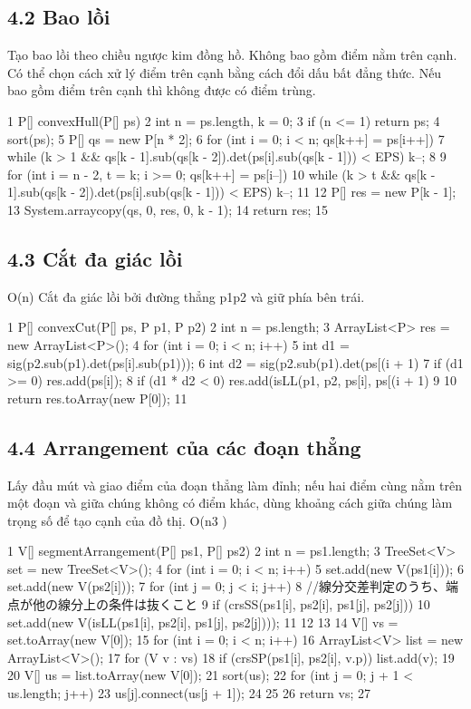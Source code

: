 \documentclass[11pt]{article}
\begin{document}
\subsection{4.2 Bao lồi}
\begin{NoteBlock}
Tạo bao lồi theo chiều ngược kim đồng hồ.
Không bao gồm điểm nằm trên cạnh.
Có thể chọn cách xử lý điểm trên cạnh bằng cách đổi dấu bất đẳng thức.
Nếu bao gồm điểm trên cạnh thì không được có điểm trùng.
\end{NoteBlock}
\begin{Code}
1 P[] convexHull(P[] ps) {
2 int n = ps.length, k = 0;
3 if (n <= 1) return ps;
4 sort(ps);
5 P[] qs = new P[n * 2];
6 for (int i = 0; i < n; qs[k++] = ps[i++]) {
7 while (k > 1 && qs[k - 1].sub(qs[k - 2]).det(ps[i].sub(qs[k - 1])) < EPS) k--;
8 }
9 for (int i = n - 2, t = k; i >= 0; qs[k++] = ps[i--]) {
10 while (k > t && qs[k - 1].sub(qs[k - 2]).det(ps[i].sub(qs[k - 1])) < EPS) k--;
11 }
12 P[] res = new P[k - 1];
13 System.arraycopy(qs, 0, res, 0, k - 1);
14 return res;
15 }
\end{Code}
\subsection{4.3 Cắt đa giác lồi}
\begin{NoteBlock}
O(n)
Cắt đa giác lồi bởi đường thẳng p1p2 và giữ phía bên trái.
\end{NoteBlock}
\begin{Code}
1 P[] convexCut(P[] ps, P p1, P p2) {
2 int n = ps.length;
3 ArrayList<P> res = new ArrayList<P>();
4 for (int i = 0; i < n; i++) {
5 int d1 = sig(p2.sub(p1).det(ps[i].sub(p1)));
6 int d2 = sig(p2.sub(p1).det(ps[(i + 1) %
7 if (d1 >= 0) res.add(ps[i]);
8 if (d1 * d2 < 0) res.add(isLL(p1, p2, ps[i], ps[(i + 1) %
9 }
10 return res.toArray(new P[0]);
11 }
\end{Code}
\subsection{4.4 Arrangement của các đoạn thẳng}
\begin{NoteBlock}
Lấy đầu mút và giao điểm của đoạn thẳng làm đỉnh; nếu hai điểm cùng nằm trên một đoạn và giữa chúng không có điểm khác, dùng khoảng cách giữa chúng làm trọng số
để tạo cạnh của đồ thị.
O(n3
)
\end{NoteBlock}
\begin{Code}
1 V[] segmentArrangement(P[] ps1, P[] ps2) {
2 int n = ps1.length;
3 TreeSet<V> set = new TreeSet<V>();
4 for (int i = 0; i < n; i++) {
5 set.add(new V(ps1[i]));
6 set.add(new V(ps2[i]));
7 for (int j = 0; j < i; j++) {
8 //線分交差判定のうち、端点が他の線分上の条件は抜くこと
9 if (crsSS(ps1[i], ps2[i], ps1[j], ps2[j])) {
10 set.add(new V(isLL(ps1[i], ps2[i], ps1[j], ps2[j])));
11 }
12 }
13 }
14 V[] vs = set.toArray(new V[0]);
15 for (int i = 0; i < n; i++) {
16 ArrayList<V> list = new ArrayList<V>();
17 for (V v : vs) {
18 if (crsSP(ps1[i], ps2[i], v.p)) list.add(v);
19 }
20 V[] us = list.toArray(new V[0]);
21 sort(us);
22 for (int j = 0; j + 1 < us.length; j++) {
23 us[j].connect(us[j + 1]);
24 }
25 }
26 return vs;
27 }
\end{Code}
\end{document}
